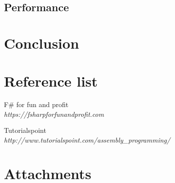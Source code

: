 \documentclass[12pt, a4paper]{article}
\begin{document}
\subsection{Performance}
\newpage

\section{Conclusion}
\newpage

\section{Reference list}

\begin{thebibliography}{9}

F\# for fun and profit\\
\emph{https://fsharpforfunandprofit.com}

Tutorialspoint\\
\emph{http://www.tutorialspoint.com/assembly\_programming/}

 
\end{thebibliography}
\newpage

\section{Attachments}
\end{document}
